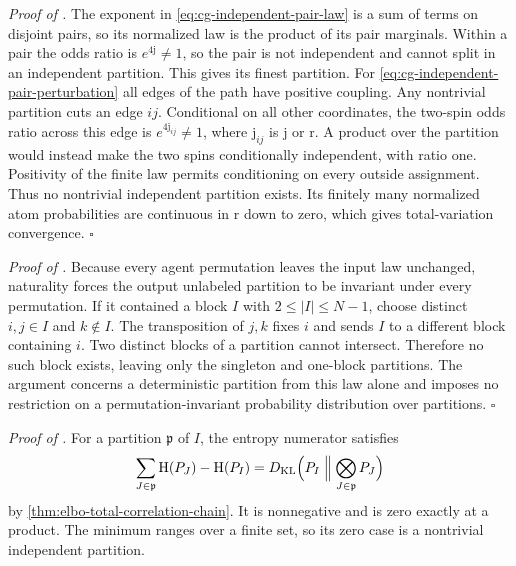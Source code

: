 \noindent\emph{Proof of .}
The exponent in \eqref{eq:cg-independent-pair-law} is a sum of terms on disjoint
pairs, so its normalized law is the product of its pair marginals. Within a pair
the odds ratio is $e^{4\mathrm j}\ne1$, so the pair is not independent and cannot
split in an independent partition. This gives its finest partition. For
\eqref{eq:cg-independent-pair-perturbation} all edges of the path have positive
coupling. Any nontrivial partition cuts an edge $ij$. Conditional on all other
coordinates, the two-spin odds ratio across this edge is $e^{4\mathrm j_{ij}}\ne1$,
where $\mathrm j_{ij}$ is $\mathrm j$ or $\mathrm r$. A product over the partition
would instead make the two spins conditionally independent, with ratio one. Positivity
of the finite law permits conditioning on every outside assignment. Thus no nontrivial
independent partition exists. Its finitely many normalized atom probabilities are
continuous in $\mathrm r$ down to zero, which gives total-variation convergence. $\square$

\noindent\emph{Proof of .}
Because every agent permutation leaves the input law unchanged, naturality forces the
output unlabeled partition to be invariant under every permutation. If it contained
a block $I$ with $2\leq|I|\leq N-1$, choose distinct $i,j\in I$ and $k\notin I$.
The transposition of $j,k$ fixes $i$ and sends $I$ to a different block containing $i$.
Two distinct blocks of a partition cannot intersect. Therefore no such block exists,
leaving only the singleton and one-block partitions. The argument concerns a
deterministic partition from this law alone and imposes no restriction on a
permutation-invariant probability distribution over partitions. $\square$

\noindent\emph{Proof of .}
For a partition $\mathfrak p$ of $I$, the entropy numerator satisfies
\begin{equation*}
\sum_{J\in\mathfrak p}\mathrm H(P_J)-\mathrm H(P_I)
=D_{\mathrm{KL}}\Bigl(P_I\Bigm\Vert\bigotimes_{J\in\mathfrak p}P_J\Bigr)
\end{equation*}
by \cref{thm:elbo-total-correlation-chain}. It is nonnegative and is zero exactly at a
product. The minimum ranges over a finite set, so its zero case is a nontrivial
independent partition.

